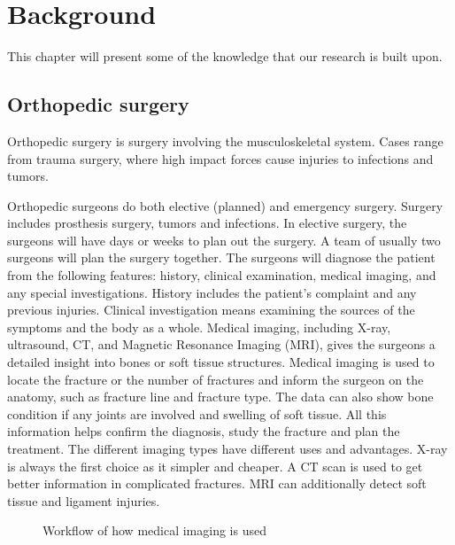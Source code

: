 \documentclass[a4paper]{report}
\begin{document}
\chapter{Background}\label{Background}
This chapter will present some of the knowledge that our research is built upon.

\section{Orthopedic surgery}

Orthopedic surgery is surgery involving the musculoskeletal system. Cases range from trauma surgery, where high impact forces cause injuries to infections and tumors\cite{swiontkowski_manual_2013}.

Orthopedic surgeons do both elective (planned) and emergency surgery. Surgery includes prosthesis surgery, tumors and infections.
In elective surgery, the surgeons will have days or weeks to plan out the surgery. A team of usually two surgeons will plan the surgery together.
The surgeons will diagnose the patient from the following features: history, clinical examination, medical imaging, and any special investigations. History includes the patient's complaint and any previous injuries. Clinical investigation means examining the sources of the symptoms and the body as a whole. Medical imaging, including X-ray, ultrasound, CT, and Magnetic Resonance Imaging (MRI), gives the surgeons a detailed insight into bones or soft tissue structures\cite{swiontkowski_manual_2013}.
Medical imaging is used to locate the fracture or the number of fractures and inform the surgeon on the anatomy, such as fracture line and fracture type. 
The data can also show bone condition if any joints are involved and swelling of soft tissue. All this information helps confirm the diagnosis, study the fracture and plan the treatment\cite{ebnezar_textbook_2016}.
The different imaging types have different uses and advantages.
X-ray is always the first choice as it simpler and cheaper\cite{ebnezar_textbook_2016}.
A CT scan is used to get better information in complicated fractures. MRI can additionally detect soft tissue and ligament injuries.

\begin{figure}[h!]
    \centering
	\hfill
  \caption{Workflow of how medical imaging is used}
  \label{flow}
  \small
\end{figure}
\end{document}
